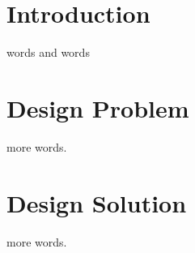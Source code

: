 \documentclass{article}
\begin{document}




    

    
	\begin{abstract}
        sadf
	\end{abstract}

    \section{Introduction}
     words and words

    \section{Design Problem}
    more words.

    \section{Design Solution}
    more words.

	
\end{document}

